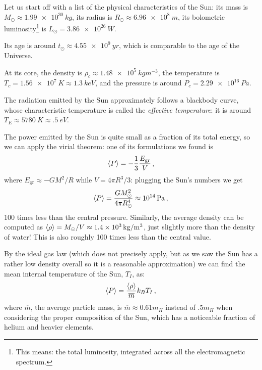 \documentclass[main.tex]{subfiles}
\begin{document}
Let us start off with a list of the physical characteristics of the Sun: its mass is \(M_{\odot} \approx \SI{1.99e30}{kg}\), its radius is \(R_{\odot} \approx \SI{6.96e8}{m}\), its bolometric luminosity\footnote{This means: the total luminosity, integrated across all the electromagnetic spectrum.} is \(L_{\odot} = \SI{3.86e26}{W}\). 

Its age is around \(t_{\odot} \approx \SI{4.55e9}{yr}\), which is comparable to the age of the Universe. 

At its core, the density is \(\rho _c \approx \SI{1.48e5}{kg m^{-3}}\), the temperature is \(T_c = \SI{1.56e7}{K} \approx \SI{1.3}{keV}\), and the pressure is around \(P_c = \SI{2.29e16}{Pa}\).  

The radiation emitted by the Sun approximately follows a blackbody curve, whose characteristic temperature is called the \emph{effective temperature}: it is around \(T_E \approx \SI{5780}{K} \approx \SI{.5}{eV}\). 


The power emitted by the Sun is quite small as a fraction of its total energy, so we can apply the virial theorem: one of its formulations we found is
%
\begin{align}
  \expval{P} = -\frac{1}{3} \frac{E _{\text{gr}}}{V}
\,,
\end{align}
%
where \(E _{\text{gr}} \approx - G M^2/R\) while \(V = 4 \pi R^3/3\): plugging the Sun's numbers we get 
%
\begin{align}
  \expval{P} 
  = \frac{G M_{\odot}^2}{4 \pi R_{\odot}^{4}}
  \approx \SI{e14}{Pa}
\,,
\end{align}
%
100 times less than the central pressure. 
Similarly, the average density can be computed as \(\expval{\rho } = M _{\odot} / V \approx \SI{1.4e3}{kg/m^3}\), just slightly more than the density of water! This is also roughly 100 times less than the central value.



By the ideal gas law (which does not precisely apply, but as we saw the Sun has a rather low density overall so it is a reasonable approximation) we can find the mean internal temperature of the Sun, \(T_I\), as:
%
\begin{align}
  \expval{P} = \frac{\expval{\rho}}{\overline{m}} k_B T_I
\,,
\end{align}
%
where \(\overline{m}\), the average particle mass, is \(\overline{m} \approx 0.61 m_H\) instead of \(\num{.5} m_H\) when considering the proper composition of the Sun, which has a noticeable fraction of helium and heavier elements. 
\end{document}
